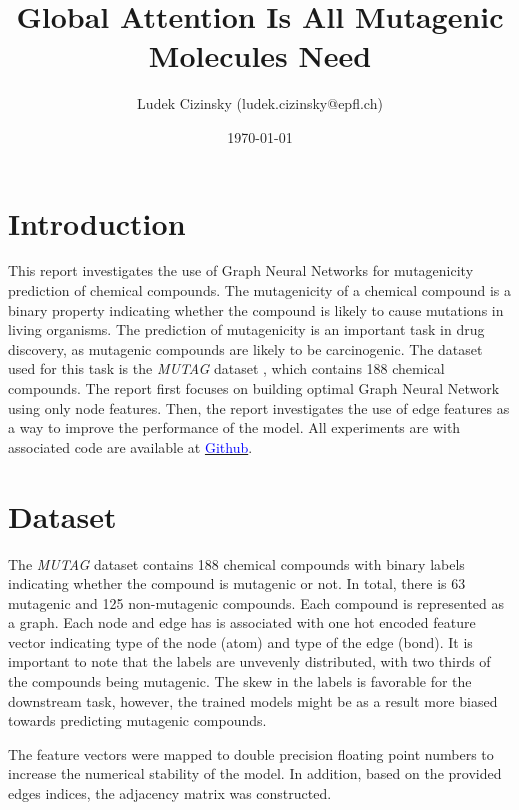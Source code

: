 \documentclass[10pt,twocolumn]{article}
\title{\vspace{-2cm}Global Attention Is All Mutagenic Molecules Need}
\author{Ludek Cizinsky (ludek.cizinsky@epfl.ch)}
\date{\today}
\begin{document}
\maketitle

\section{Introduction}
This report investigates the use of Graph Neural Networks
for mutagenicity prediction of chemical compounds. 
The mutagenicity of a chemical compound is a binary property
indicating whether the compound is likely to cause mutations
in living organisms. The prediction of mutagenicity is an
important task in drug discovery, as mutagenic compounds
are likely to be carcinogenic. The dataset used for this task is the 
\textit{MUTAG} dataset \cite{mutag}, which contains 188 chemical compounds.
The report first focuses on building optimal Graph Neural Network using
only node features. Then, the report investigates the use of edge features
as a way to improve the performance of the model. All experiments are
with associated code are available at \href{https://github.com/ludekcizinsky/epfl-cs502/tree/main/coursework/homeworks/hw2}{\textcolor{blue}{Github}}. 

\section{Dataset}\label{sec:dataset}
The \textit{MUTAG} dataset \cite{mutag} contains 188 chemical compounds with
binary labels indicating whether the compound is mutagenic or not. In total,
there is 63 mutagenic and 125 non-mutagenic compounds. Each compound is represented
as a graph. Each node and edge has is associated with one hot encoded feature vector
indicating type of the node (atom) and type of the edge (bond). It is important to note
that the labels are unvevenly distributed, with two thirds of the compounds being mutagenic.
The skew in the labels is favorable for the downstream task, however, the trained
models might be as a result more biased towards predicting mutagenic compounds.


The feature vectors were mapped to double precision floating point numbers to
increase the numerical stability of the model. In addition, based on the provided
edges indices, the adjacency matrix was constructed.


\end{document}
